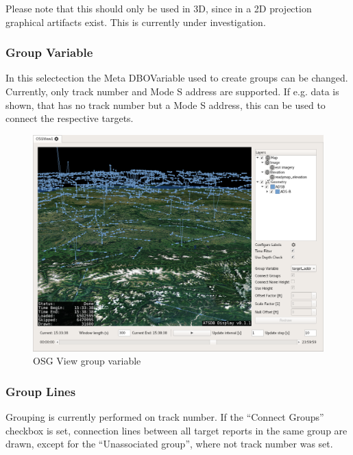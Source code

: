 {Please note that this should only be used in 3D, since in a 2D projection graphical artifacts exist. This is currently under investigation.

\subsubsection{Group Variable}

In this selectection the Meta DBOVariable used to create groups can be changed. Currently, only track number and Mode S address are supported. If e.g. data is shown, that has no track number but a Mode S address, this can be used to connect the respective targets.

\begin{figure}[H]
    \hspace*{-2cm}
    \includegraphics[width=18cm,frame]{../screenshots/osgview_group_variable.png}
  \caption{OSG View group variable}
\end{figure}


\subsubsection{Group Lines}

Grouping is currently performed on track number. If the ``Connect Groups'' checkbox is set, connection lines between all target reports in the same group are drawn, except for the ``Unassociated group'', where not track number was set.

}
